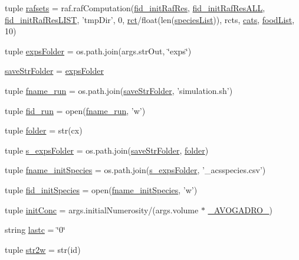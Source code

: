 \begin{DoxyCompactItemize}
\item 
tuple \hyperlink{a00096_a36370edf2a6a4e19f0a99413aac43096}{rafsets} = raf.\-raf\-Computation(\hyperlink{a00096_a2f9cfe05abfed3ab6326d0cb094c7c80}{fid\-\_\-init\-Raf\-Res}, \hyperlink{a00096_add1c3bb75f1d98889c27099fc14fc6a8}{fid\-\_\-init\-Raf\-Res\-A\-L\-L}, \hyperlink{a00096_a7af2668de12720f3c7925527002d81b0}{fid\-\_\-init\-Raf\-Res\-L\-I\-S\-T}, 'tmp\-Dir', 0, \hyperlink{a00096_a61159eb5aec77b97808ce3fb742d8f6d}{rct}/float(len(\hyperlink{a00096_aff8baae5d4cd1678204477dd5e620775}{species\-List})), rcts, \hyperlink{a00096_aea4d714ca7ceaba151380b3aed7c34d8}{cats}, \hyperlink{a00096_a878da371fd02e9515fe7305e0a57be09}{food\-List}, 10)
\item 
tuple \hyperlink{a00096_aa78205fca6ef215871776684bc141b26}{exps\-Folder} = os.\-path.\-join(args.\-str\-Out, \char`\"{}exps\char`\"{})
\item 
\hyperlink{a00096_adf74f9028f6a6e9a2de2046146a29ffe}{save\-Str\-Folder} = \hyperlink{a00096_aa78205fca6ef215871776684bc141b26}{exps\-Folder}
\item 
tuple \hyperlink{a00096_a58053e5bf5bd9f634c82e6fe7a330770}{fname\-\_\-run} = os.\-path.\-join(\hyperlink{a00096_adf74f9028f6a6e9a2de2046146a29ffe}{save\-Str\-Folder}, 'simulation.\-sh')
\item 
tuple \hyperlink{a00096_a107606e6132ad38bc8591a7931a277fc}{fid\-\_\-run} = open(\hyperlink{a00096_a58053e5bf5bd9f634c82e6fe7a330770}{fname\-\_\-run}, 'w')
\item 
tuple \hyperlink{a00096_a42c0d5f9f5131fc14ddb04d765cee15b}{folder} = str(cx)
\item 
tuple \hyperlink{a00096_ad8daa0d6fb501f0e422c7fb04e93c7cd}{s\-\_\-exps\-Folder} = os.\-path.\-join(\hyperlink{a00096_adf74f9028f6a6e9a2de2046146a29ffe}{save\-Str\-Folder}, \hyperlink{a00096_a42c0d5f9f5131fc14ddb04d765cee15b}{folder})
\item 
tuple \hyperlink{a00096_a6053e1a97cef2ed661333b2a7b0cf67e}{fname\-\_\-init\-Species} = os.\-path.\-join(\hyperlink{a00096_ad8daa0d6fb501f0e422c7fb04e93c7cd}{s\-\_\-exps\-Folder}, '\-\_\-acsspecies.\-csv')
\item 
tuple \hyperlink{a00096_aac88079820753d1e8c6628b7016a71d5}{fid\-\_\-init\-Species} = open(\hyperlink{a00096_a6053e1a97cef2ed661333b2a7b0cf67e}{fname\-\_\-init\-Species}, 'w')
\item 
tuple \hyperlink{a00096_a4fad8527bf8c9b7981003678aba3edff}{init\-Conc} = args.\-initial\-Numerosity/(args.\-volume $\ast$ \hyperlink{a00096_abfe2f871ea28e48198cdd5799807de5b}{\-\_\-\-A\-V\-O\-G\-A\-D\-R\-O\-\_\-})
\item 
string \hyperlink{a00096_ae1f2c64eb13a9c020ffe6ec073883573}{lastc} = \char`\"{}0\char`\"{}
\item 
tuple \hyperlink{a00096_a015e630bcbd779acd7f68bf514793e0d}{str2w} = str(id)
\end{DoxyCompactItemize}


